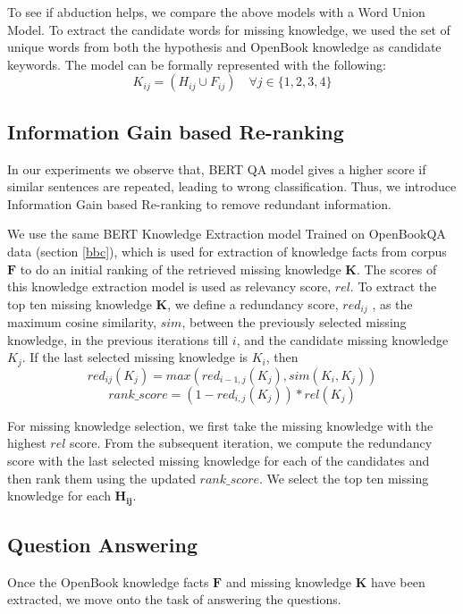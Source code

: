 \documentclass[11pt,a4paper]{article}
\begin{document}
To see if abduction helps, we compare the above models with a Word Union Model.
To extract the candidate words for missing knowledge, we used the set of unique words from both the hypothesis and OpenBook knowledge as candidate keywords. The model can be formally represented with the following:
\begin{equation*}
    K_{ij} = (H_{ij} \cup F_{ij}) \quad \forall j \in \{1,2,3,4\}
\end{equation*}


\subsection{Information Gain based Re-ranking}
In our experiments we observe that, BERT QA model gives a higher score if similar sentences are repeated, leading to wrong classification. Thus, we introduce Information Gain based Re-ranking to remove redundant information.

We use the same BERT Knowledge Extraction model Trained on OpenBookQA data (section \ref{bbc}), which is used for extraction of knowledge facts from corpus $\mathbf{F}$ to do an initial ranking of the retrieved missing knowledge $\mathbf{K}$. The scores of this knowledge extraction model is used as relevancy score, $rel$. To extract the top ten missing knowledge $\mathbf{K}$, we define a redundancy score, $red_{ij}$ , as the maximum cosine similarity, $sim$, between the previously selected missing knowledge, in the previous iterations till $i$, and the candidate missing knowledge $K_j$. 
If the last selected missing knowledge is $K_i$, then
\begin{equation*}
    red_{ij}(K_j) = max(red_{i-1,j}(K_j), sim(K_i,K_j))
\end{equation*}
\begin{equation*}
    rank\_score  = (1-red_{i,j}(K_j))*rel(K_j)
\end{equation*}

For missing knowledge selection, we first take the missing knowledge with the highest $rel$ score. From the subsequent iteration, we compute the redundancy score with the last selected missing knowledge for each of the candidates and then rank them using the updated $rank\_score$. We select the top ten missing knowledge for each $\mathbf{H_{ij}}$. 

\subsection{Question Answering}
Once the OpenBook knowledge facts $\mathbf{F}$ and missing knowledge $\mathbf{K}$ have been extracted, we move onto the task of answering the questions. 
\end{document}

